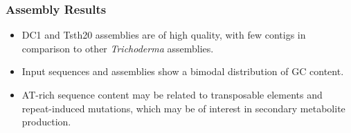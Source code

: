 \documentclass[t]{beamer}
\begin{document}
\begin{frame}
	\frametitle{Assembly Results}
	\centering
	\vspace{0.5cm}
	\begin{itemize}
		\item DC1 and Tsth20 assemblies are of high quality, with few contigs in comparison to other \textit{Trichoderma} assemblies.
		\item Input sequences and assemblies show a bimodal distribution of GC content.
		\item AT-rich sequence content may be related to transposable elements and repeat-induced mutations, which may be of interest in secondary metabolite production.
	\end{itemize}
\end{frame}
\end{document}
